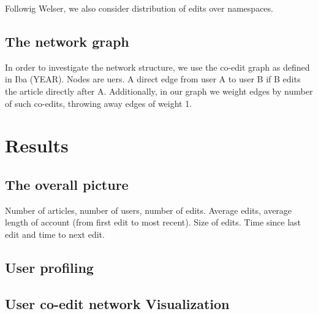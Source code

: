 \documentclass{article}
\begin{document}
Followig Welser, we also consider distribution of edits over namespaces. 


\subsection{The network graph}

In order to investigate the network structure, we use the co-edit graph as defined in Iba (YEAR). Nodes are uers. A direct edge from user A to user B if B edits the article directly after A. Additionally, in our graph we weight edges by number of such co-edits, throwing away edges of weight 1. 


\section{Results}
\subsection{The overall picture}
Number of articles, number of users, number of edits. Average edits, average length of account (from first edit to most recent). Size of edits. Time since last edit and time to next edit.

\subsection{User profiling}

\subsection{User co-edit network Visualization}
\end{document}
